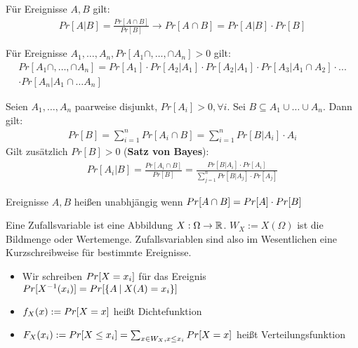 \begin{satz}
	Für Ereignisse $A,B$ gilt:
	\begin{align*}
		Pr[A | B] = \frac{Pr[A \cap B]}{Pr[B]} \rightarrow Pr[A \cap B] = Pr [A | B] \cdot Pr[B]
	\end{align*}
\end{satz}

\begin{satz}[Multiplikationssatz]
	Für Ereignisse $A_1, \dots, A_n, Pr[A_1 \cap, \dots ,\cap A_n] > 0$ gilt:
	\begin{align*}
		Pr[A_1 \cap, \dots ,\cap A_n] = Pr[A_1]  \cdot Pr[A_2 | A_1] \cdot Pr[A_2|A_1] \cdot Pr[A_3 | A_1 \cap A_2] \cdot  ... \\ \cdot Pr[A_n | A_1 \cap \dots A_n] 
	\end{align*}
\end{satz}

\begin{satz}
	Seien $A_1,\dots,A_n$ paarweise disjunkt, $Pr[A_i] > 0, \forall i$. Sei $B \subseteq A_1 \cup \dots \cup A_n$. Dann gilt:
	\begin{align*}
	Pr[B] = \sum_{i=1}^{n} Pr[A_i \cap B] = \sum_{i=1}^n Pr[B | A_i] \cdot A_i
	\end{align*}
	Gilt zusätzlich $Pr[B] > 0$ (\textbf{Satz von Bayes}):
	\begin{align*}
		Pr[A_i | B] = \frac{Pr[A_i \cap B]}{Pr[B]} = \frac{Pr[B | A_i] \cdot Pr[A_i]}{\sum_{j=1}^n Pr[B | A_j] \cdot Pr[A_j]}
	\end{align*}
\end{satz}

\begin{definition}
	Ereignisse $A, B$ heißen unabhjängig wenn $Pr[A \cap B] = Pr[A] \cdot Pr[B]$
\end{definition}

\begin{definition}[Zufallsvariable]
	Eine Zufallsvariable ist eine Abbildung $X : \Omega \rightarrow \mathbb{R}$. $W_X := X(\Omega)$ ist die Bildmenge oder Wertemenge. Zufallsvariablen sind also im Wesentlichen eine Kurzschreibweise für bestimmte Ereignisse.
	\begin{itemize}[noitemsep]
		\item Wir schreiben $Pr[X = x_i]$ für das Ereignis $Pr[X^{-1}(x_i)] = Pr[\{A \medspace | \medspace X(A) = x_i\}]$
		\item $f_X(x) := Pr[X = x]$ heißt Dichtefunktion
		\item $F_X(x_i) := Pr[X \leq x_i] = \sum_{x \in W_X, x \leq x_i} Pr[X = x]$ heißt Verteilungsfunktion
	\end{itemize} 
\end{definition}

